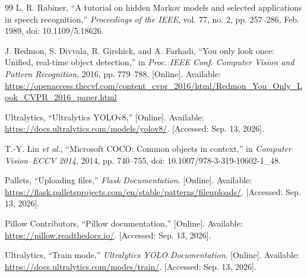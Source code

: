\documentclass[12pt,a4paper,openany]{report}
\begin{document}
\begin{thebibliography}{99}
\fi
\ifdefined\AssignmentVersion
{}
L. R. Rabiner, ``A tutorial on hidden Markov models and selected applications
in speech recognition,'' \emph{Proceedings of the IEEE}, vol. 77, no. 2,
pp. 257--286, Feb. 1989, doi: 10.1109/5.18626.

\else
{}
J. Redmon, S. Divvala, R. Girshick, and A. Farhadi, ``You only look once:
Unified, real-time object detection,'' in \emph{Proc. IEEE Conf. Computer
Vision and Pattern Recognition}, 2016, pp. 779--788. [Online]. Available:
\url{https://openaccess.thecvf.com/content_cvpr_2016/html/Redmon_You_Only_Look_CVPR_2016_paper.html}

Ultralytics, ``Ultralytics YOLOv8,'' [Online]. Available:
\url{https://docs.ultralytics.com/models/yolov8/}. [Accessed: Sep. 13, 2026].

T.-Y. Lin \emph{et al.}, ``Microsoft COCO: Common objects in context,'' in
\emph{Computer Vision--ECCV 2014}, 2014, pp. 740--755,
doi: 10.1007/978-3-319-10602-1\_48.

Pallets, ``Uploading files,'' \emph{Flask Documentation}. [Online]. Available:
\url{https://flask.palletsprojects.com/en/stable/patterns/fileuploads/}.
[Accessed: Sep. 13, 2026].

Pillow Contributors, ``Pillow documentation,'' [Online]. Available:
\url{https://pillow.readthedocs.io/}. [Accessed: Sep. 13, 2026].

Ultralytics, ``Train mode,'' \emph{Ultralytics YOLO Documentation}. [Online].
Available: \url{https://docs.ultralytics.com/modes/train/}.
[Accessed: Sep. 13, 2026].

\fi
\end{thebibliography}
\end{document}

